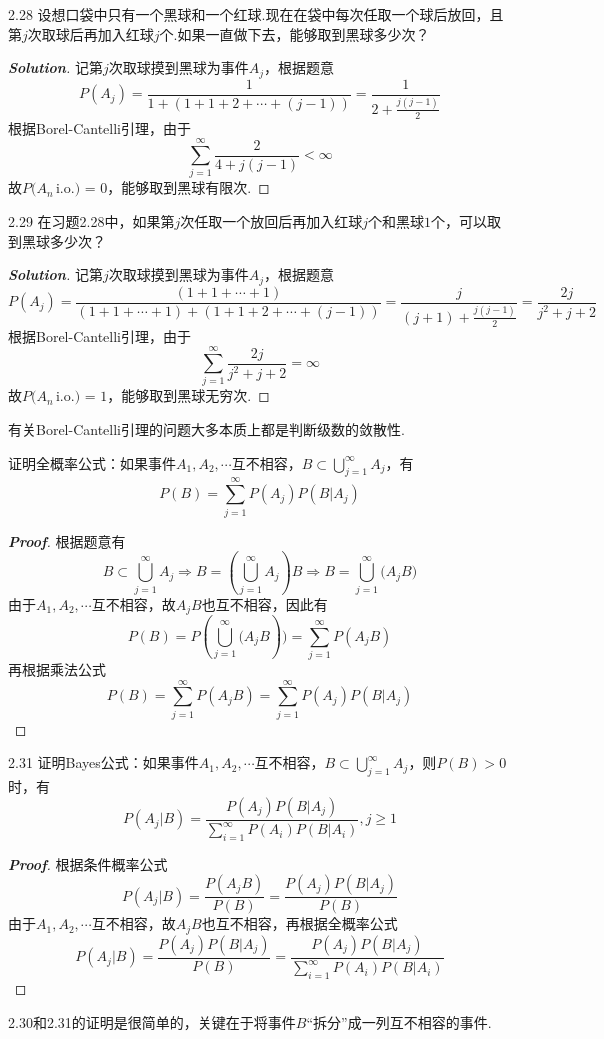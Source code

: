 \documentclass[10pt, a4paper, oneside]{ctexart}
\newenvironment{solution}{\begin{proof}[\bf Solution]}{\end{proof}}
\newenvironment{myproof}{\begin{proof}[\bf Proof]}{\end{proof}}
\begin{document}
2.28 设想口袋中只有一个黑球和一个红球.现在在袋中每次任取一个球后放回，且第$j$次取球后再加入红球$j$个.如果一直做下去，能够取到黑球多少次？
\begin{solution}
记第$j$次取球摸到黑球为事件$A_j$，根据题意
\[P({A_j}) = \frac{1}{{1 + (1 + 1 + 2 +  \cdots  + (j - 1))}} = \frac{1}{{2 + \frac{{j(j - 1)}}{2}}}\]
根据Borel-Cantelli引理，由于
\[\sum\limits_{j = 1}^\infty  {\frac{2}{{4 + j(j - 1)}}}  < \infty \]
故$P({A_n}\,{\text{i}}.{\text{o}}{\text{.) = 0}}$，能够取到黑球有限次.
\end{solution}

2.29 在习题2.28中，如果第$j$次任取一个放回后再加入红球$j$个和黑球$1$个，可以取到黑球多少次？
\begin{solution}
记第$j$次取球摸到黑球为事件$A_j$，根据题意
\[P({A_j}) = \frac{{(1 + 1 +  \cdots  + 1)}}{{(1 + 1 +  \cdots  + 1) + (1 + 1 + 2 +  \cdots  + (j - 1))}} = \frac{j}{{(j + 1) + \frac{{j(j - 1)}}{2}}} = \frac{{2j}}{{{j^2} + j + 2}}\]
根据Borel-Cantelli引理，由于
\[\sum\limits_{j = 1}^\infty  {\frac{{2j}}{{{j^2} + j + 2}}}  = \infty \]
故$P({A_n}\,{\text{i}}.{\text{o}}{\text{.) = 1}}$，能够取到黑球无穷次.
\end{solution}
\begin{remark}
有关Borel-Cantelli引理的问题大多本质上都是判断级数的敛散性.
\end{remark}

 证明全概率公式：如果事件$A_1,A_2,\cdots$互不相容，$B\subset \bigcup\limits_{j = 1}^\infty  {{A_j}} $，有
\[P(B) = \sum\limits_{j = 1}^\infty  {P({A_j})P(B|{A_j})} \]
\begin{myproof}
根据题意有
\[B \subset \bigcup\limits_{j = 1}^\infty  {{A_j}}  \Rightarrow B = (\bigcup\limits_{j = 1}^\infty  {{A_j}} )B \Rightarrow B = \bigcup\limits_{j = 1}^\infty  {({A_j}} B)\]
由于$A_1,A_2,\cdots$互不相容，故$A_jB$也互不相容，因此有
\[P(B) = P(\bigcup\limits_{j = 1}^\infty  {({A_j}} B)) = \sum\limits_{j = 1}^\infty  {P({A_j}B)} \]
再根据乘法公式
\[P(B) = \sum\limits_{j = 1}^\infty  {P({A_j}B)}  = \sum\limits_{j = 1}^\infty  {P({A_j})P(B|{A_j})} \]
\end{myproof}


2.31 证明Bayes公式：如果事件$A_1,A_2,\cdots$互不相容，$B\subset \bigcup\limits_{j = 1}^\infty  {{A_j}} $，则$P(B)>0$时，有
\[P({A_j}|B) = \frac{{P({A_j})P(B|{A_j})}}{{\sum\limits_{i = 1}^\infty  {P({A_i})P(B|{A_i})} }},j \geqslant 1\]
\begin{myproof}
根据条件概率公式
  \[P({A_j}|B) = \frac{{P({A_j}B)}}{{P(B)}} = \frac{{P({A_j})P(B|{A_j})}}{{P(B)}}\]
由于$A_1,A_2,\cdots$互不相容，故$A_jB$也互不相容，再根据全概率公式
\[P({A_j}|B) = \frac{{P({A_j})P(B|{A_j})}}{{P(B)}} = \frac{{P({A_j})P(B|{A_j})}}{{\sum\limits_{i = 1}^\infty  {P({A_i})P(B|{A_i})} }}\]

\end{myproof}
\begin{remark}
2.30和2.31的证明是很简单的，关键在于将事件$B$“拆分”成一列互不相容的事件.
\end{remark}
\end{document}
